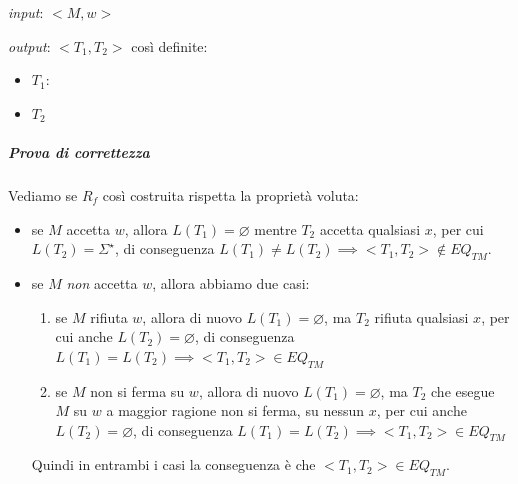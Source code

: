 \begin{description}
\item \textit{input}: $<M, w>$
\item \textit{output}: $<T_1, T_2>$ così definite:
\begin{itemize}
\item $T_1$:

\vspace{1cm}

\item $T_2$
\end{itemize}
\end{description}

\subparagraph{Prova di correttezza}

Vediamo se $R_f$ così costruita rispetta la proprietà voluta:

\begin{itemize}
\item se $M$ accetta $w$, allora $L(T_1) = \varnothing$ mentre $T_2$ accetta qualsiasi $x$, per cui $L(T_2) = \Sigma^{\star}$, di conseguenza $L(T_1) \neq L(T_2) \implies <T_1, T_2> \notin EQ_{TM}$.

\item se $M$ \textit{non} accetta $w$, allora abbiamo due casi:
\begin{enumerate}
\item se $M$ rifiuta $w$, allora di nuovo $L(T_1) = \varnothing$, ma $T_2$ rifiuta qualsiasi $x$, per cui anche $L(T_2) = \varnothing$, di conseguenza $L(T_1) = L(T_2) \implies <T_1, T_2> \in EQ_{TM}$

\item se $M$ non si ferma su $w$, allora di nuovo $L(T_1) = \varnothing$, ma $T_2$ che esegue $M$ su $w$ a maggior ragione non si ferma, su nessun $x$, per cui anche $L(T_2) = \varnothing$, di conseguenza $L(T_1) = L(T_2) \implies <T_1, T_2> \in EQ_{TM}$
\end{enumerate}
Quindi in entrambi i casi la conseguenza è che $<T_1, T_2> \in EQ_{TM}$.
\end{itemize}

